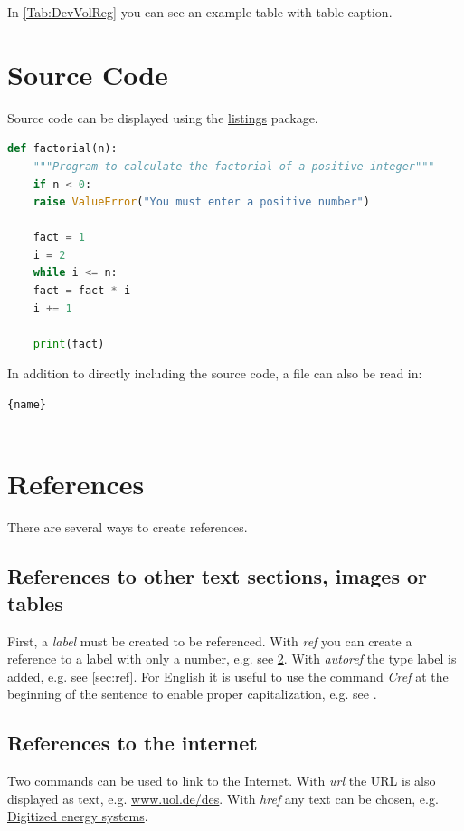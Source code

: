 In \autoref{Tab:DevVolReg} you can see an example table with table caption.

\section{Source Code}
\label{sec:code}

Source code can be displayed using the \href{https://www.ctan.org/pkg/listings}{listings} package.

\begin{lstlisting}[caption=examplecode,language=python]
	def factorial(n):
	"""Program to calculate the factorial of a positive integer"""
	if n < 0:
	raise ValueError("You must enter a positive number")
	
	fact = 1
	i = 2
	while i <= n:
	fact = fact * i
	i += 1
	
	print(fact)
\end{lstlisting}

In addition to directly including the source code, a file can also be read in:
\begin{lstlisting}{name}
	
\end{lstlisting}

\section{References}
\label{sec:ref}

There are several ways to create references.

\subsection{References to other text sections, images or tables}
First, a \textit{label} must be created to be referenced.
With \textit{ref} you can create a reference to a label with only a number, e.g. see \ref{sec:ref}. With \textit{autoref} the type label is added, e.g. see \autoref{sec:ref}. For English it is useful to use the command \textit{Cref} at the beginning of the sentence to enable proper capitalization, e.g. see .

\subsection{References to the internet}
Two commands can be used to link to the Internet. With \textit{url} the URL is also displayed as text, e.g. \url{www.uol.de/des}.
With \textit{href} any text can be chosen, e.g. \href{www.uol.de/des}{Digitized energy systems}.

